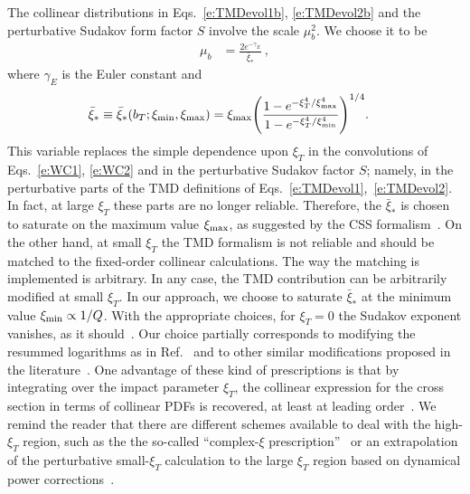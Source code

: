 \documentclass[aps,preprintnumbers,showpacs,nofootinbib,superscriptaddress,floatfix]{revtex4}
\newcommand{\bT}{\xi_T}
\newcommand{\bb}{\xi}
\begin{document}
The collinear distributions in Eqs.~\eqref{e:TMDevol1b}, \eqref{e:TMDevol2b} 
and the perturbative Sudakov form factor $S$ 
involve the 
scale $\mu_b^2$. 
We choose it to be
\begin{align} 
\mu_b &= \frac{2 e^{-\gamma_E}}{\bar{\bb}_{\ast}} \  ,
\label{e:mub}
\end{align}  
where $\gamma_E$ is the Euler constant and
\begin{align} 
\bar{\bb}_{\ast} &\equiv \bar{\bb}_{\ast}(b_T;\bb_{\rm min},\bb_{\rm max}) = \bb_{\rm max} \Bigg(\frac{1-e^{- \bT^4 / \bb_{\rm max}^4} }{1-e^{- \bT^4 / \bb_{\rm min}^4}} \Bigg)^{1/4} .
\label{e:b*}
\end{align}  
This variable replaces the simple dependence upon $\bT$ in the
  convolutions of Eqs.~\eqref{e:WC1}, \eqref{e:WC2} and in the perturbative
  Sudakov factor $S$; namely, in the perturbative parts of the
  TMD definitions of Eqs.~\eqref{e:TMDevol1},~\eqref{e:TMDevol2}. In fact, at
  large $\bT$ these parts are no longer reliable. Therefore, the
  $\bar{\bb}_{\ast}$ is chosen to saturate on the maximum value $\bb_{\rm max}$,
  as suggested by the CSS 
  formalism~\cite{Collins:2011zzd,Aybat:2011zv}.
On the other hand, at
small $\bT$ the TMD formalism is not reliable and should be 
matched to the fixed-order collinear
calculations. The way
the matching is implemented is arbitrary.  In any case, the TMD contribution
can be arbitrarily modified at small $\bT$. In our approach, we choose to
saturate 
$\bar{\bb}_{\ast}$  at
the minimum value $\bb_{\rm min}\propto 1/Q$. With the appropriate choices, 
for $\bT=0$ the Sudakov exponent vanishes, as it
should~\cite{Parisi:1979se,Altarelli:1984pt}. 
Our choice partially corresponds to modifying the resummed logarithms as in
Ref.~\cite{Bozzi:2010xn} and to other similar modifications proposed in the
literature~\cite{Boer:2014tka,Collins:2016hqq}. One advantage of these kind of
prescriptions is that by integrating over the impact parameter $\bT$, the
collinear expression for the cross section in terms of collinear PDFs is
recovered, at least at leading order~\cite{Collins:2016hqq}.
We remind the reader that there are different schemes available to deal with
the high-$\bT$ region, such as the the so-called ``complex-$\bb$
prescription''~\cite{Laenen:2000de} or an extrapolation of the perturbative
small-$\bb_T$ calculation to the large $\bb_T$ region based on dynamical power
corrections~\cite{Qiu:2000hf}. 
\end{document}
